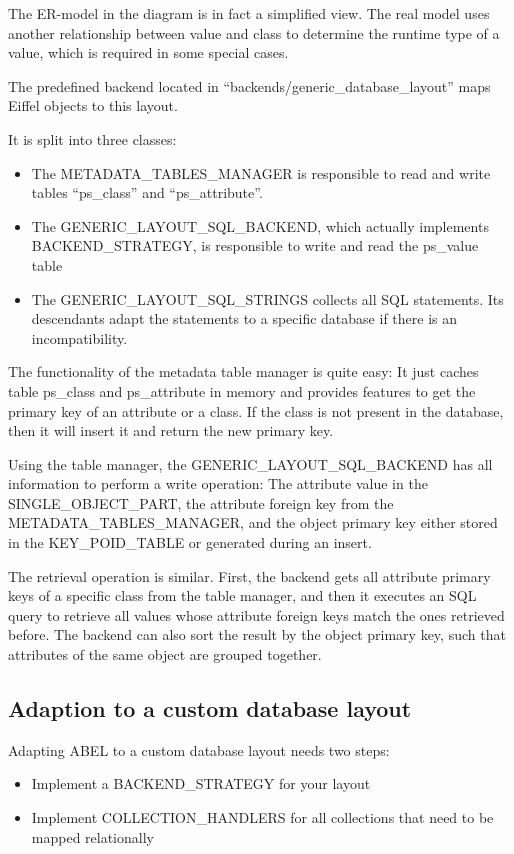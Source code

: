 The ER-model in the diagram is in fact a simplified view. 
The real model uses another relationship between value and class to determine the runtime type of a value, which is required in some special cases.

The predefined backend located in ``backends/generic\_database\_layout'' maps Eiffel objects to this layout.

It is split into three classes:
\begin{itemize}
 \item The METADATA\_TABLES\_MANAGER is responsible to read and write tables ``ps\_class'' and ``ps\_attribute''.
 \item The GENERIC\_LAYOUT\_SQL\_BACKEND, which actually implements BACKEND\_STRATEGY, is responsible to write and read the ps\_value table
 \item The GENERIC\_LAYOUT\_SQL\_STRINGS collects all SQL statements. Its descendants adapt the statements to a specific database if there is an incompatibility.
\end{itemize}

The functionality of the metadata table manager is quite easy:
It just caches table ps\_class and ps\_attribute in memory and provides features to get the primary key of an attribute or a class.
If the class is not present in the database, then it will insert it and return the new primary key.

Using the table manager, the GENERIC\_LAYOUT\_SQL\_BACKEND has all information to perform a write operation:
The attribute value in the SINGLE\_OBJECT\_PART, the attribute foreign key from the METADATA\_TABLES\_MANAGER, and the object primary key either stored in the KEY\_POID\_TABLE or generated during an insert.

The retrieval operation is similar.
First, the backend gets all attribute primary keys of a specific class from the table manager, and then it executes an SQL query to retrieve all values whose attribute foreign keys match the ones retrieved before.
The backend can also sort the result by the object primary key, such that attributes of the same object are grouped together.


\subsection{Adaption to a custom database layout}
\label{subsection:specific_adaption}

Adapting ABEL to a custom database layout needs two steps:
 \begin{itemize}
  \item Implement a BACKEND\_STRATEGY for your layout
  \item Implement COLLECTION\_HANDLERS for all collections that need to be mapped relationally
 \end{itemize}

